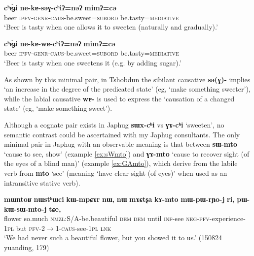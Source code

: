 \documentclass[oneside,a4paper,11pt]{article}
\newcommand{\ipa}[1]{\textbf{{\phon\mbox{#1}}}} %
\newcommand{\forme}[2]{\ipa{#1} `#2'}
\begin{document}
\begin{exe}
\ex \label{ex:sEGchi}
\gll \ipa{cʰɐ́ɟi}	\ipa{ne-kɐ-səɣ-cʰiʔ=nəʔ}	\ipa{mimʔ=cə} \\
beer \textsc{ipfv-genr-caus}-be.sweet=\textsc{subord} be.tasty=\textsc{mediative} \\
\glt `Beer is tasty when one allows it to sweeten (naturally and gradually).'
\end{exe}

 \begin{exe}
\ex \label{ex:wAchi}
\gll \ipa{cʰɐ́ɟi}	\ipa{ne-kɐ-wɐ-cʰiʔ=nəʔ}	\ipa{mimʔ=cə} \\
beer \textsc{ipfv-genr-caus}-be.sweet=\textsc{subord} be.tasty=\textsc{mediative} \\
\glt `Beer is tasty when one sweetens it (e.g. by adding sugar).'
\end{exe}

As shown by this minimal pair, in Tshobdun the sibilant causative \ipa{sə(ɣ)-} implies `an increase in the degree  of the predicated state' (eg, `make something sweeter'), while the labial causative \ipa{wɐ-} is used to express the `causation of a changed state' (eg, `make something sweet').

Although a cognate pair exists in Japhug \ipa{sɯx-cʰi} vs \ipa{ɣɤ-cʰi} `sweeten', no semantic contrast could be ascertained with my Japhug consultants. The only minimal pair in Japhug with an observable meaning is that between \forme{sɯ-mto}{cause to see, show} (example \ref{ex:sWmto}) and \forme{ɣɤ-mto}{cause to recover sight (of the eyes of a blind man)} (example \ref{ex:GAmto}), which derive from the labile verb from \forme{mto}{see} (meaning `have clear sight (of eyes)' when used as an intransitive stative verb).


\begin{exe}
\ex \label{ex:sWmto}
\gll
\ipa{mɯntoʁ} 	\ipa{nɯstʰɯci} 	\ipa{kɯ-mpɕɤr} 	\ipa{nɯ,} 	\ipa{nɯ} 	\ipa{mɤɕtʂa} 	\ipa{kɤ-mto} 	\ipa{mɯ-pɯ-rɲo-j} 	\ipa{ri,} 	\ipa{pɯ-kɯ-sɯ-mto-j} 	\ipa{tɕe,} \\
flower so.much \textsc{nmzl}:S/A-be.beautiful \textsc{dem} \textsc{dem}  until \textsc{inf}-see \textsc{neg-pfv}-experience-\textsc{1pl} but \textsc{pfv}-2$\rightarrow$1-\textsc{caus}-see-\textsc{1pl} \textsc{lnk} \\
\glt `We had never such a beautiful flower, but you showed it to us.' (150824 yuanding, 179)
\end{exe}
\end{document}
